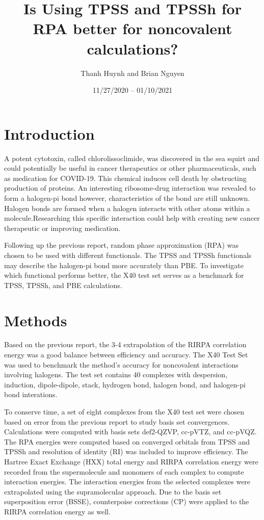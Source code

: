 \documentclass[11pt]{article}
\title{\textbf{Is Using TPSS and TPSSh for RPA better for noncovalent
    calculations?}}
\author{Thanh Huynh and Brian Nguyen}
\date{11/27/2020 -- 01/10/2021 }
\begin{document}
\maketitle

\section{Introduction}

A potent cytotoxin, called chlorolissoclimide, was discovered
in the sea squirt and could potentially be useful in cancer therapeutics
or other pharmaceuticals, such as medication for COVID-19. This chemical
induces cell death by obstructing production of proteins. An interesting
ribosome-drug interaction was revealed to form a halogen-pi bond however,
characteristics of the bond are still unknown. Halogen bonds are formed
when a halogen interacts with other atoms within a molecule.Researching
this specific interaction could help with creating new cancer therapeutic
or improving medication.

Following up the previous report, random phase approximation (RPA) was
chosen to be used with different functionals. The TPSS and TPSSh
functionals may describe the halogen-pi bond more accurately than PBE.
To investigate which functional performs better, the X40 test set serves
as a benchmark for TPSS, TPSSh, and PBE calculations.  


\section{Methods}

Based on the previous report, the 3-4 extrapolation of the RIRPA
correlation energy was a good balance between efficiency and accuracy.
The X40 Test Set was used to benchmark the method's accuracy for 
noncovalent interactions involving halogens. The test set contains 40
complexes with despersion, induction, dipole-dipole, stack, hydrogen
bond, halogen bond, and halogen-pi bond interations.

To conserve time, a set of eight complexes from the X40 test set were
chosen based on error from the previous report to study basis set
convergences. Calculations were computed with basis sets def2-QZVP,
cc-pVTZ, and cc-pVQZ. The RPA energies were computed based on converged
orbitals from TPSS and TPSSh and resolution of identity (RI) was included
to improve efficiency. The Hartree Exact Exchange (HXX) total energy and
RIRPA correlation energy were recorded from the supermolecule and
monomers of each complex to compute interaction energies. The interaction
energies from the selected complexes were extrapolated using the
supramolecular approach. Due to the basis set superposition error (BSSE),
counterpoise corrections (CP) were applied to the RIRPA correlation
energy as well.
\end{document}
